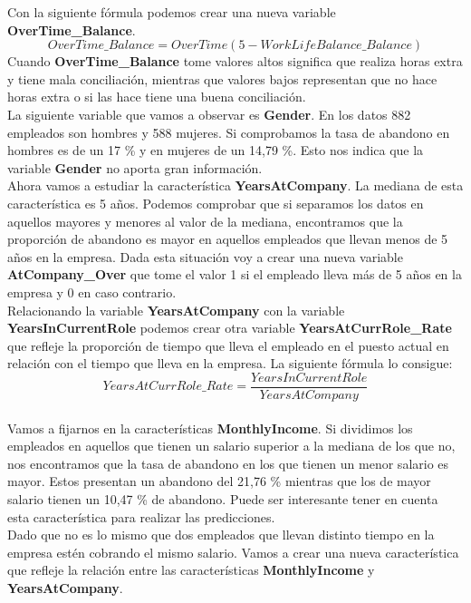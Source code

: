 Con la siguiente fórmula podemos crear una nueva variable \textbf{OverTime\_Balance}. 
\[ \mathit{OverTime\_Balance} = \mathit{OverTime} (5-\mathit{WorkLifeBalance\_Balance})\]
Cuando \textbf{OverTime\_Balance} tome valores altos significa que realiza horas extra y tiene mala conciliación, mientras que valores bajos representan que no hace horas extra o si las hace tiene una buena conciliación.\\


La siguiente variable que vamos a observar es \textbf{Gender}. En los datos 882 empleados son hombres y 588 mujeres.
Si comprobamos la tasa de abandono en hombres es de un 17 \% y en mujeres de un 14,79 \%. Esto nos indica que la variable \textbf{Gender} no aporta gran información.\\

Ahora vamos a estudiar la característica \textbf{YearsAtCompany}. La mediana de esta característica es 5 años. Podemos comprobar que si separamos los datos en aquellos mayores y menores al valor de la mediana,
encontramos que la proporción de abandono es mayor en aquellos empleados que llevan menos de 5 años en la empresa.
Dada esta situación voy a crear una nueva variable \textbf{AtCompany\_Over} que tome el valor 1 si el empleado lleva más de 5 años en la empresa y 0 en caso contrario.\\

Relacionando la variable \textbf{YearsAtCompany} con la variable \textbf{YearsInCurrentRole} podemos crear otra variable \textbf{YearsAtCurrRole\_Rate} que refleje
la proporción de tiempo que lleva el empleado en el puesto actual en relación con el tiempo que lleva en la empresa. La siguiente fórmula lo consigue:\\

\[ \mathit{YearsAtCurrRole\_Rate} = \frac{\mathit{YearsInCurrentRole}}{\mathit{YearsAtCompany}}\]
\\

Vamos a fijarnos en la características \textbf{MonthlyIncome}. Si dividimos los empleados en aquellos que tienen un salario superior a la mediana de los que no, nos encontramos que la tasa de abandono en los que tienen un menor salario es mayor. Estos presentan un abandono del 21,76 \% mientras que los de mayor salario tienen un 10,47 \% de abandono. Puede ser interesante tener en cuenta esta característica para realizar las predicciones.\\

Dado que no es lo mismo que dos empleados que llevan distinto tiempo en la empresa estén cobrando el mismo salario. Vamos a crear una nueva característica que refleje la relación entre las características \textbf{MonthlyIncome} y \textbf{YearsAtCompany}.\\

